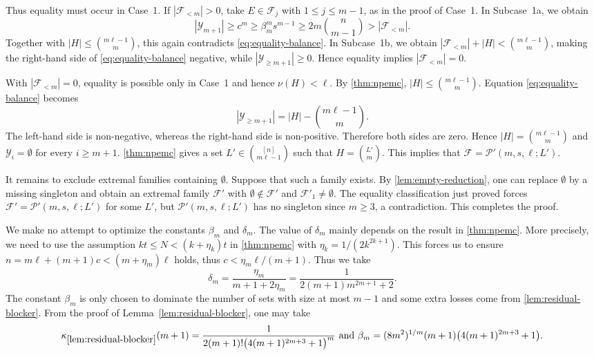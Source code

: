 \documentclass[10pt,a4paper]{article}
\numberwithin{equation}{section}
\theoremstyle{definition}
\newcommand{\F}{\mathcal F}
\newcommand{\Y}{\mathcal Y}
\begin{document}
Thus equality must occur in Case~1.
If $|\F_{<m}|>0$, take $E\in\F_j$ with $1\le j\le m-1$, as in the proof of Case~1.
In Subcase~1a, we obtain
\[
        |\Y_{m+1}|
        \ge c^m
        \ge \beta_m^m s^{m-1}
        \ge 2m\binom n{m-1}
        > |\F_{<m}|.
\]
Together with $|H|\le\binom{m\ell-1}{m}$, this again contradicts \eqref{eq:equality-balance}.
In Subcase~1b, we obtain $|\F_{<m}|+|H|<\binom{m\ell-1}{m}$, making the right-hand side of \eqref{eq:equality-balance} negative, while $|\Y_{\ge m+1}|\ge0$.
Hence equality implies $|\F_{<m}|=0$.

With $|\F_{<m}|=0$, equality is possible only in Case~1 and hence $\nu(H)<\ell$.
By \cref{thm:npemc}, $|H|\le\binom{m\ell-1}{m}$.
Equation \eqref{eq:equality-balance} becomes
\[
        |\Y_{\ge m+1}|=|H|-\binom{m\ell-1}{m}.
\]
The left-hand side is non-negative, whereas the right-hand side is non-positive.
Therefore both sides are zero.
Hence $|H|=\binom{m\ell-1}{m}$ and $\Y_i=\emptyset$ for every $i\ge m+1$.
\cref{thm:npemc} gives a set $L'\in\binom{[n]}{m\ell-1}$ such that $H=\binom{L'}m$.
This implies that $\F=\mathcal P'(m,s,\ell;L')$.

It remains to exclude extremal families containing $\emptyset$.
Suppose that such a family exists.
By \cref{lem:empty-reduction}, one can replace $\emptyset$ by a missing singleton and obtain an extremal family $\F'$ with $\emptyset\notin\F'$ and $\F'_1\ne\emptyset$.
The equality classification just proved forces $\F'=\mathcal P'(m,s,\ell;L')$ for some $L'$, but $\mathcal P'(m,s,\ell;L')$ has no singleton since $m\ge3$, a contradiction.
This completes the proof.

\medskip

 We make no attempt to optimize the constants $\beta_m$ and $\delta_m$.
The value of $\delta_m$ mainly depends on the result in \cref{thm:npemc}.
More precisely, we need to use the assumption $kt\le N<(k+\eta_k)t$ in \cref{thm:npemc} with $\eta_k=1/(2k^{2k+1})$.
This forces us to ensure $n=m\ell+(m+1)c < (m+\eta_m)\ell$ holds, thus $c<\eta_m\ell/(m+1)$.
Thus we take
\[
        \delta_m=\frac{\eta_m}{m+1+2\eta_m}
        =
        \frac{1}{2(m+1)m^{2m+1}+2}.
\]
The constant $\beta_m$ is only chosen to dominate the number of sets with size at most $m-1$ and some extra losses come from \cref{lem:residual-blocker}.
From the proof of Lemma~\ref{lem:residual-blocker}, one may take
\[
        \kappa_{\ref{lem:residual-blocker}}(m+1)
        =
        \frac{1}{2(m+1)!\bigl(4(m+1)^{2m+3}+1\bigr)^m}
        \text{ and }
        \beta_m
        =
        (8m^2)^{1/m}(m+1)\bigl(4(m+1)^{2m+3}+1\bigr).
\]
\end{document}
